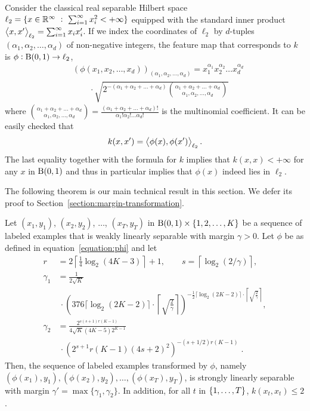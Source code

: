 Consider the classical real separable Hilbert space $\ell_2 = \{ x \in \mathbb{R}^\infty
~:~ \sum_{i=1}^\infty x_i^2 < + \infty \}$ equipped with the standard inner
product $\left\langle x, x' \right\rangle_{\ell_2} = \sum_{i=1}^\infty x_i x'_i$. If we index the
coordinates of $\ell_2$ by $d$-tuples $(\alpha_1, \alpha_2, \dots, \alpha_d)$ of
non-negative integers, the feature map that corresponds to $k$ is $\phi: \operatorname{B}(0,1)
\to \ell_2$,
\begin{align}
& \left(\phi(x_1, x_2, \dots, x_d)\right)_{(\alpha_1, \alpha_2, \dots, \alpha_d)} = x_1^{\alpha_1} x_2^{\alpha_2} \dots x_d^{\alpha_d} \nonumber \\
& \qquad \cdot \sqrt{2^{-(\alpha_1 + \alpha_2 + \dots + \alpha_d)} \binom{\alpha_1 + \alpha_2 + \dots + \alpha_d}{\alpha_1, \alpha_2, \dots, \alpha_d}}
\label{equation:phi}
\end{align}
where $\binom{\alpha_1 + \alpha_2 + \dots + \alpha_d}{\alpha_1, \alpha_2, \dots,
\alpha_d} = \frac{(\alpha_1 + \alpha_2 + \dots + \alpha_d)!}{\alpha_1! \alpha_2!
\dots \alpha_d!}$ is the multinomial coefficient. It can be easily checked that
$$
k(x,x') = \left\langle \phi(x), \phi(x') \right\rangle_{\ell_2}.
$$
The last equality together with the formula for $k$ implies that $k(x,x) <
+\infty$ for any $x$ in $\operatorname{B}(0,1)$ and thus in particular implies that $\phi(x)$
indeed lies in $\ell_2$.

The following theorem is our main technical result in this section. We defer its
proof to Section~\ref{section:margin-transformation}.

\begin{theorem}
\label{theorem:margin-transformation}
Let $(x_1, y_1)$, $(x_2, y_2)$, $\dots$, $(x_T, y_T)$ in $\operatorname{B}(0,1) \times
\{1,2,\dots,K\}$ be a sequence of labeled examples that is weakly linearly
separable with margin $\gamma > 0$. Let $\phi$ be as defined in
equation~\eqref{equation:phi} and let
\begingroup
\allowdisplaybreaks
\begin{align*}
r & = 2 \left\lceil \frac{1}{4} \log_2(4K-3) \right\rceil + 1, \quad \quad s = \left \lceil \log_2(2/\gamma) \right \rceil, \\
\gamma_1 & = \frac{1}{2\sqrt{K}}  \\
& \ \cdot \left(376 \lceil \log_2(2K-2) \rceil \cdot \left \lceil \sqrt{\frac{2}{\gamma}} \right \rceil \right)^{-\frac{1}{2} \lceil \log_2(2K-2) \rceil \cdot \left \lceil \sqrt{\frac{2}{\gamma}} \right \rceil}, \\
\gamma_2 & = \frac{2^{s(s+1)r(K-1)} }{4\sqrt{K}(4K-5) 2^{K-1}} \\
& \ \cdot \left(2^{s+1} r(K-1) (4s+2)^2 \right)^{-(s+1/2)r(K-1)} \; .
\end{align*}
\endgroup
Then, the sequence of labeled examples transformed by $\phi$,
namely $(\phi(x_1), y_1), (\phi(x_2), y_2), \dots,
(\phi(x_T), y_T)$, is strongly linearly separable with margin $\gamma' =
\max\{\gamma_1, \gamma_2\}$. In addition, for all $t$ in $\cbr{1,\ldots,T}$,
$k(x_t,x_t) \leq 2$.
\end{theorem}


